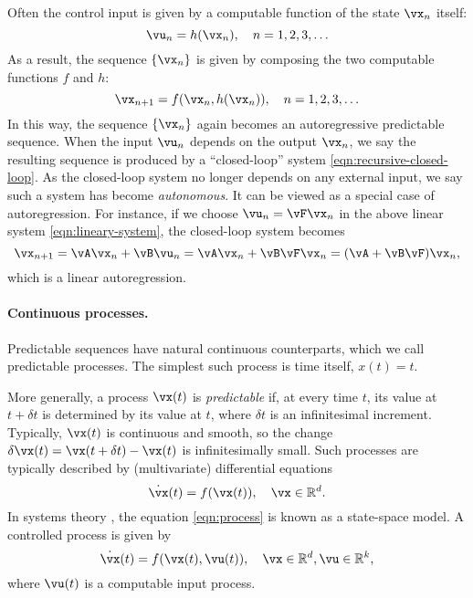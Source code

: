 \documentclass[../../book-main.tex]{subfiles}
\begin{document}
Often the control input is given by a computable function of the state $\vx_{n}$ itself: 
\begin{equation}
    \vu_{n} = h(\vx_{n}), \quad n = 1, 2, 3, \ldots 
\end{equation}
As a result, the sequence $\{\vx_{n}\}$ is given by composing the two computable functions $f$ and $h$:
\begin{equation}
    \vx_{n+1} = f(\vx_{n}, h(\vx_{n})), \quad n = 1, 2, 3, \ldots
    \label{eqn:recursive-closed-loop}
\end{equation}
In this way, the sequence $\{\vx_{n}\}$ again becomes an autoregressive predictable sequence. When the input $\vu_{n}$ depends on the output $\vx_{n}$, we say the resulting sequence is produced by a ``closed-loop'' system \eqref{eqn:recursive-closed-loop}. As the closed-loop system no longer depends on any external input, we say such a system has become \textit{autonomous}. It can be viewed as a special case of autoregression. For instance, if we choose $\vu_{n} = \vF\vx_{n}$ in the above linear system \eqref{eqn:lineary-system}, the closed-loop system becomes
\begin{equation}
        \vx_{n+1} = \vA\vx_{n} + \vB\vu_{n} = \vA\vx_{n} + \vB\vF\vx_{n} = (\vA + \vB\vF)\vx_{n},
    \label{eqn:lineary-system-closed}
\end{equation}
which is a linear autoregression.



\paragraph{Continuous processes.}
Predictable sequences have natural continuous counterparts, which we call predictable processes. The simplest such process is time itself, $x(t) = t$.

More generally, a process $\vx(t)$ is \textit{predictable} if, at every time $t$, its value at $t + \delta t$ is determined by its value at $t$, where $\delta t$ is an infinitesimal increment. Typically, $\vx(t)$ is continuous and smooth, so the change $\delta \vx(t) = \vx(t + \delta t) - \vx(t)$ is infinitesimally small. Such processes are typically described by (multivariate) differential equations
\begin{equation}
    \dot{\vx}(t) = f(\vx(t)), \quad \vx \in \R^{d}.
    \label{eqn:process}
\end{equation}
In systems theory \cite{Cal:Des,Sastry-Nonlinear}, the equation \eqref{eqn:process} is known as a state-space model. A controlled process is given by
\begin{equation}
    \dot{\vx}(t) = f(\vx(t), \vu(t)), \quad \vx \in \R^{d}, \vu \in \R^{k},
    \label{eqn:process-controlled}
\end{equation}
where $\vu(t)$ is a computable input process.
\end{document}
